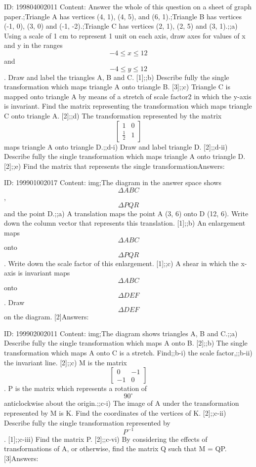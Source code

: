 \documentclass{article}
\begin{document}
ID: 199804002011
Content:
Answer the whole of this question on a sheet of graph paper.;Triangle A has vertices (4, 1), (4, 5), and (6, 1).;Triangle B has vertices (-1, 0), (3, 0) and (-1, -2).;Triangle C has vertices (2, 1), (2, 5) and (3, 1).;;a) Using a scale of 1 cm to represent 1 unit on each axis, draw axes for values of x and y in the ranges $$-4\leq x \leq 12$$ and $$-4\leq y \leq 12$$. Draw and label the triangles A, B and C. [1];;b) Describe fully the single transformation which maps triangle A onto triangle B. [3];;c) Triangle C is mapped onto triangle A by means of a stretch of scale factor2 in which the y-axis is invariant. Find the matrix representing the transformation which maps triangle C onto triangle A. [2];;d) The transformation represented by the matrix $$\begin{bmatrix}1&0\\ \frac{1}{2}&1\end{bmatrix}$$maps triangle A onto triangle D.;;d-i) Draw and label triangle D. [2];;d-ii) Describe fully the single transformation which maps triangle A onto triangle D. [2];;e) Find the matrix that represents the single transformationAnswers:

ID: 199901002017
Content:
img;The diagram in the answer space shows $$\Delta  ABC$$, $$\Delta  PQR$$ and the point D.;;a) A translation maps the point A (3, 6) onto D (12, 6). Write down the column vector that represents this translation. [1];;b) An enlargement maps $$\Delta  ABC$$ onto $$\Delta  PQR$$. Write down the scale factor of this enlargement. [1];;c) A shear in which the x-axis is invariant maps $$\Delta  ABC$$ onto $$\Delta  DEF$$. Draw $$\Delta  DEF$$ on the diagram. [2]Answers:

ID: 199902002011
Content:
img;The diagram shows triangles A, B and C.;;a) Describe fully the single transformation which maps A onto B. [2];;b) The single transformation which maps A onto C is a stretch. Find;;b-i) the scale factor,;;b-ii) the invariant line. [2];;c) M is the matrix $$\begin{bmatrix}0&-1\\-1&0\end{bmatrix}$$. P is the matrix which represents a rotation of $$90^{\circ}$$ anticlockwise about the origin.;;c-i) The image of A under the transformation represented by M is K. Find the coordinates of the vertices of K. [2];;c-ii) Describe fully the single transformation represented by $$P^{-1}$$. [1];;c-iii) Find the matrix P. [2];;c-vi) By considering the effects of transformations of A, or otherwise, find the matrix Q such that M = QP. [3]Answers:
\end{document}
